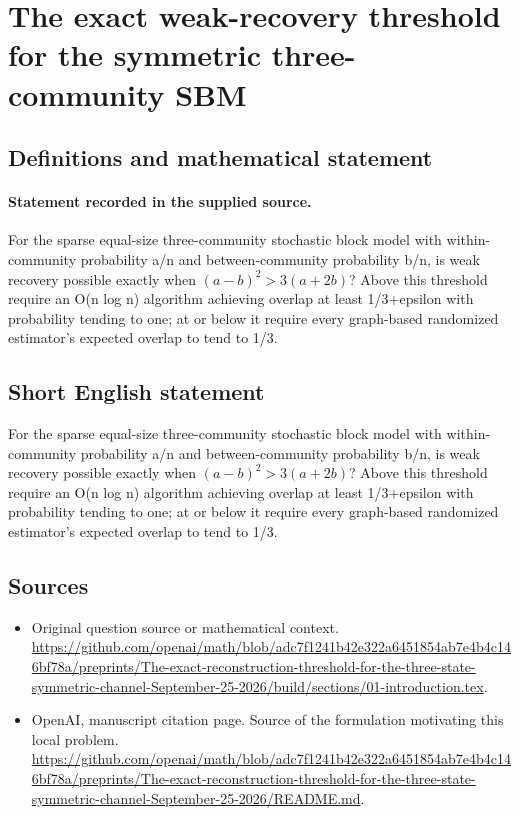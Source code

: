 \documentclass[11pt]{article}
\begin{document}
\section*{The exact weak-recovery threshold for the symmetric three-community SBM}\label{30007401}
\subsection{Definitions and mathematical statement}
\paragraph{Statement recorded in the supplied source.}
For the sparse equal-size three-community stochastic block model with within-community probability a/n and between-community probability b/n, is weak recovery possible exactly when $(a-b)^2>3(a+2b)$? Above this threshold require an O(n log n) algorithm achieving overlap at least 1/3+epsilon with probability tending to one; at or below it require every graph-based randomized estimator’s expected overlap to tend to 1/3.
\subsection{Short English statement}
For the sparse equal-size three-community stochastic block model with within-community probability a/n and between-community probability b/n, is weak recovery possible exactly when $(a-b)^2>3(a+2b)$? Above this threshold require an O(n log n) algorithm achieving overlap at least 1/3+epsilon with probability tending to one; at or below it require every graph-based randomized estimator’s expected overlap to tend to 1/3.
\subsection{Sources}
\begin{itemize}
\item[S1] Original question source or mathematical context.
\url{https://github.com/openai/math/blob/adc7f1241b42e322a6451854ab7e4b4c146bf78a/preprints/The-exact-reconstruction-threshold-for-the-three-state-symmetric-channel-September-25-2026/build/sections/01-introduction.tex}.
\item[S2] OpenAI, manuscript citation page. Source of the formulation motivating this local problem.
\url{https://github.com/openai/math/blob/adc7f1241b42e322a6451854ab7e4b4c146bf78a/preprints/The-exact-reconstruction-threshold-for-the-three-state-symmetric-channel-September-25-2026/README.md}.
\end{itemize}
\end{document}
